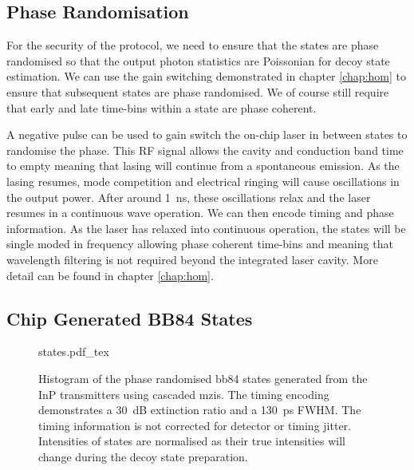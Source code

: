
\subsection{Phase Randomisation}

For the security of the protocol, we need to ensure that the states are phase randomised so that the output photon statistics are Poissonian for decoy state estimation. We can use the gain switching demonstrated in chapter \ref{chap:hom} to ensure that subsequent states are phase randomised. We of course still require that early and late time-bins within a state are phase coherent. 

A negative pulse can be used to gain switch the on-chip laser in between states to randomise the phase. This RF signal allows the cavity and conduction band time to empty meaning that lasing will continue from a spontaneous emission. As the lasing resumes, mode competition and electrical ringing will cause oscillations in the output power. After around \SI{1}{ns}, these oscillations relax and the laser resumes in a continuous wave operation. We can then encode timing and phase information. As the laser has relaxed into continuous operation, the states will be single moded in frequency allowing phase coherent time-bins and meaning that wavelength filtering is not required beyond the integrated laser cavity. More detail can be found in chapter \ref{chap:hom}.

\subsection{Chip Generated BB84 States}

\begin{figure}[t]
	\centering
	\small
	\def\svgwidth{0.9\textwidth} 
	{states.pdf_tex}
	\caption[Phase randomised BB84 states generated from the InP transmitters]{Histogram of the phase randomised \acs{bb84} states generated from the \ac{InP} transmitters using cascaded \acfp{mzi}. The timing encoding demonstrates a \SI{30}{dB} extinction ratio and a \SI{130}{\ps} \acs{FWHM}. The timing information is not corrected for detector or timing jitter. Intensities of states are normalised as their true intensities will change during the decoy state preparation.}
	\label{fig:states}
\end{figure}

